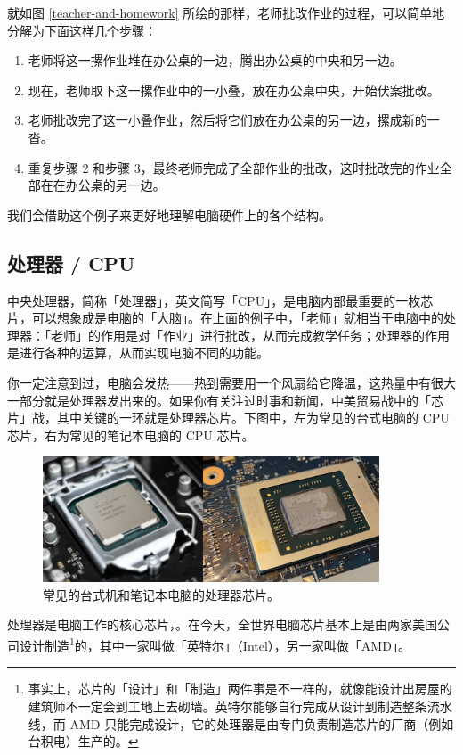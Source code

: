 就如图 \ref{teacher-and-homework} 所绘的那样，老师批改作业的过程，可以简单地分解为下面这样几个步骤：

\begin{enumerate}
  \item 老师将这一摞作业堆在办公桌的一边，腾出办公桌的中央和另一边。
  \item 现在，老师取下这一摞作业中的一小叠，放在办公桌中央，开始伏案批改。
  \item 老师批改完了这一小叠作业，然后将它们放在办公桌的另一边，摞成新的一沓。
  \item 重复步骤 2 和步骤 3，最终老师完成了全部作业的批改，这时批改完的作业全部在在办公桌的另一边。
\end{enumerate}

我们会借助这个例子来更好地理解电脑硬件上的各个结构。

\subsection{处理器 / CPU}

中央处理器，简称「处理器」，英文简写「CPU」，是电脑内部最重要的一枚芯片，可以想象成是电脑的「大脑」。在上面的例子中，「老师」就相当于电脑中的处理器：「老师」的作用是对「作业」进行批改，从而完成教学任务；处理器的作用是进行各种的运算，从而实现电脑不同的功能。

你一定注意到过，电脑会发热——热到需要用一个风扇给它降温，这热量中有很大一部分就是处理器发出来的。如果你有关注过时事和新闻，中美贸易战中的「芯片」战，其中关键的一环就是处理器芯片。下图中，左为常见的台式电脑的 CPU 芯片，右为常见的笔记本电脑的 CPU 芯片。

\begin{figure}[H]
  \centering
  \includegraphics[width=10cm]{assets/CPUs.png}
  \caption{常见的台式机和笔记本电脑的处理器芯片。}
  \label{cpus}
\end{figure}

处理器是电脑工作的核心芯片，。在今天，全世界电脑芯片基本上是由两家美国公司设计制造\footnote{事实上，芯片的「设计」和「制造」两件事是不一样的，就像能设计出房屋的建筑师不一定会到工地上去砌墙。英特尔能够自行完成从设计到制造整条流水线，而 AMD 只能完成设计，它的处理器是由专门负责制造芯片的厂商（例如台积电）生产的。}的，其中一家叫做「英特尔」（Intel），另一家叫做「AMD」。

